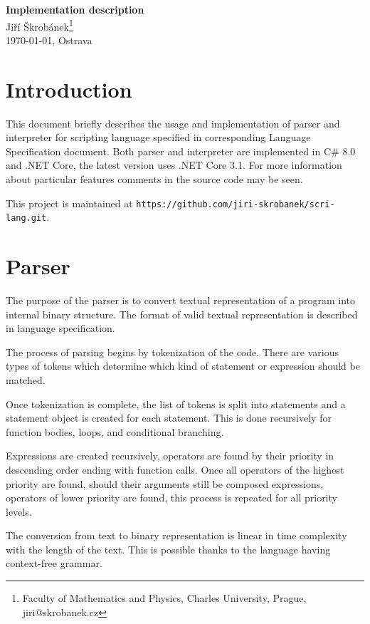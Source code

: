 \documentclass[a4paper,11pt,openany]{article}
\begin{document}
\begin{center}
{\huge \textbf{Implementation description}}\\
\vspace{10mm} {\large Jiří Škrobánek\footnote[1]{Faculty of Mathematics and Physics, Charles University, Prague, {\ttfamily jiri@skrobanek.cz}}}\\
\vspace{10mm}\today, Ostrava
\end{center}
	
\section*{Introduction}
	
This document briefly describes the usage and implementation of parser and interpreter for scripting language specified in corresponding Language Specification document. Both parser and interpreter are implemented in C\# 8.0 and .NET Core, the latest version uses .NET Core 3.1. For more information about particular features comments in the source code may be seen.

This project is maintained at \texttt{https://github.com/jiri-skrobanek/scri-lang.git}.

\section*{Parser}

The purpose of the parser is to convert textual representation of a program into internal binary structure. The format of valid textual representation is described in language specification.

The process of parsing begins by tokenization of the code. There are various types of tokens which determine which kind of statement or expression should be matched.

Once tokenization is complete, the list of tokens is split into statements and a statement object is created for each statement. This is done recursively for function bodies, loops, and conditional branching.

Expressions are created recursively, operators are found by their priority in descending order ending with function calls. Once all operators of the highest priority are found, should their arguments still be composed expressions, operators of lower priority are found, this process is repeated for all priority levels.

The conversion from text to binary representation is linear in time complexity with the length of the text. This is possible thanks to the language having context-free grammar.
	
\end{document}
